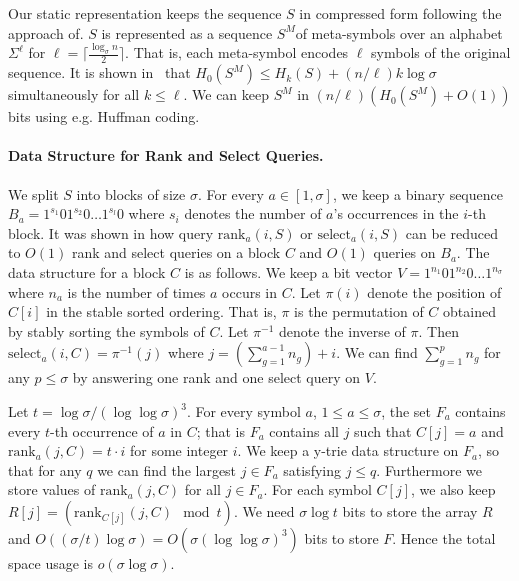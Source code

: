 \documentclass[11pt]{article}\usepackage{fullpage}
\def\idrm#1{\ensuremath{\mathrm{#1}}}
\def\ceil#1{\lceil #1 \rceil}
\newcommand{\no}[1]{}
\newcommand{\ra}{\idrm{rank}}
\newcommand{\sel}{\idrm{select}}
\begin{document}
Our static representation keeps the sequence $S$ in compressed form following the approach of\cite{FerraginaV07}. $S$ is represented as a sequence $S^M$of meta-symbols
over an alphabet $\Sigma^{\ell}$ for $\ell=\ceil{\frac{\log_{\sigma}n}{2}}$. That is, each meta-symbol encodes $\ell$ symbols of the original sequence. 
It is shown in~\cite{FerraginaV07} that $H_0(S^M)\le H_k(S) + (n/\ell)k\log\sigma$ simultaneously for all $k\le\ell$. We can keep $S^M$ in $(n/\ell)(H_0(S^M)+O(1))$ bits using e.g. Huffman coding. \no{For any $k=o(\log_\sigma n)$, this representation needs $nH_k(S) + o(nH_k(S)) +O(\frac{k+1}{\log_{\sigma}n}\log \sigma) $ bits.}
\paragraph{Data Structure for Rank and Select Queries.}
 We split $S$ into blocks of size $\sigma$. For every $a\in [1,\sigma]$, we keep a binary sequence $B_a=1^{s_1}01^{s_2}0\ldots 1^{s_l}0$
where $s_i$ denotes the number of $a$'s occurrences in the $i$-th block. 
It was shown in 
\cite{BHMR07} how query $\ra_a(i,S)$ or $\sel_a(i,S)$  can be reduced to $O(1)$ rank and select queries on a block $C$ and $O(1)$ queries on $B_a$.
The data structure for a block  $C$ is as follows. We keep a bit vector $V=1^{n_1}01^{n_2}0\ldots 1^{n_{\sigma}}$ where $n_a$ is the number of times $a$ occurs in $C$. Let $\pi(i)$ denote the 
position of $C[i]$ in the stable sorted ordering. That is, $\pi$ is the permutation of $C$ 
obtained by stably sorting the symbols of $C$. Let $\pi^{-1}$ denote the inverse of $\pi$. Then $\sel_a(i,C)=\pi^{-1}(j)$ where $j=(\sum_{g=1}^{a-1}n_g) +i$. We can find $\sum_{g=1}^p n_g$ for any $p\le \sigma$ by answering one rank and one select query on $V$. 

Let $t=\log \sigma/(\log \log \sigma)^3$.
For every symbol $a$, $1\leq a\le\sigma$, the set  $F_a$ contains every $t$-th occurrence of $a$ in $C$; that is $F_a$ contains all $j$ such that $C[j]=a$ and $\ra_a(j,C)=t\cdot i$ for some integer $i$. We keep a y-trie data structure on $F_a$, so that for any $q$ we can find the largest $j\in F_a$ satisfying $j\le q$. Furthermore we store  values of $\ra_a(j,C)$ for all $j\in F_a$. For each symbol $C[j]$, we also keep $R[j]= (\ra_{C[j]}(j,C) \mod t)$. We need $\sigma\log t$ bits to store the array $R$ and $O((\sigma/t)\log \sigma)=O(\sigma(\log\log \sigma)^3)$ bits to store $F$. Hence the total space usage is $o(\sigma\log \sigma)$.
\end{document}

